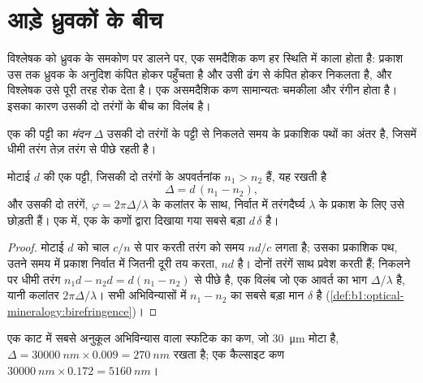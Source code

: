 \section{आड़े ध्रुवकों के बीच}

विश्लेषक को ध्रुवक के समकोण पर डालने पर, एक समदैशिक कण हर स्थिति में काला होता है: प्रकाश उस तक ध्रुवक के अनुदिश
कंपित होकर पहुँचता है और उसी ढंग से कंपित होकर निकलता है, और विश्लेषक उसे पूरी तरह रोक देता है। एक असमदैशिक कण
सामान्यतः चमकीला और रंगीन होता है। इसका कारण उसकी दो तरंगों के बीच का विलंब है।

\begin{definition}[मंदन (क्रिस्टल पट्टी में)]\label{def:b1:optical-mineralogy:retardation}
एक  की पट्टी का \emph{मंदन} $\Delta$ उसकी दो तरंगों के पट्टी से निकलते समय
के प्रकाशिक पथों का अंतर है, जिसमें धीमी तरंग तेज़ तरंग से पीछे रहती है।
\end{definition}

\begin{proposition}[मंदन और द्विअपवर्तन]\label{prop:b1:optical-mineralogy:retardation}
मोटाई $d$ की एक पट्टी, जिसकी दो तरंगों के अपवर्तनांक $n_1 > n_2$ हैं, यह  रखती है
\[
  \Delta = d\,(n_1 - n_2),
\]
और उसकी दो तरंगें, $\varphi = 2\pi\Delta/\lambda$ के कलांतर के साथ, निर्वात में तरंगदैर्घ्य $\lambda$ के प्रकाश के लिए
उसे छोड़ती हैं। एक  में, एक  के कणों द्वारा दिखाया गया सबसे बड़ा  $d\,\delta$ है।
\end{proposition}

\begin{proof}
मोटाई $d$ को चाल $c/n$ से पार करती तरंग को समय $nd/c$ लगता है; उसका प्रकाशिक पथ, उतने समय में प्रकाश निर्वात में
जितनी दूरी तय करता, $nd$ है। दोनों तरंगें साथ प्रवेश करती हैं; निकलने पर धीमी तरंग $n_1 d - n_2 d = d(n_1 - n_2)$
से पीछे है, एक विलंब जो एक आवर्त का भाग $\Delta/\lambda$ है, यानी कलांतर $2\pi\Delta/\lambda$। सभी अभिविन्यासों में
$n_1 - n_2$ का सबसे बड़ा मान $\delta$ है (\cref{def:b1:optical-mineralogy:birefringence})।
\end{proof}

एक काट में सबसे अनुकूल अभिविन्यास वाला स्फटिक का कण, जो \qty{30}{\micro m} मोटा है, $\Delta = \qty{30000}{nm}\times0.009 =
\qty{270}{nm}$ रखता है; एक कैल्साइट कण $\qty{30000}{nm}\times0.172 = \qty{5160}{nm}$।


